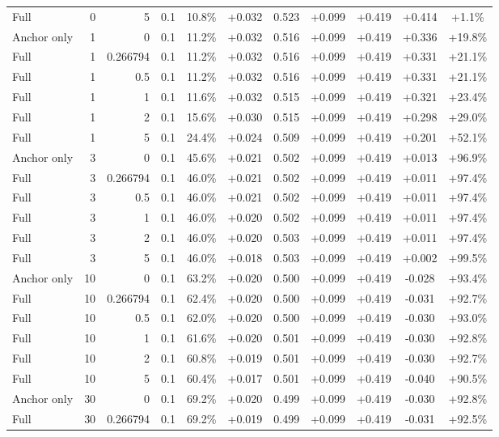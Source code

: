 \begin{table}[htbp]
\begin{tabular}{lrrrccccccc}
Full & 0 & 5 & 0.1 & 10.8\% & +0.032 & 0.523 & +0.099 & +0.419 & +0.414 & +1.1\% \\
Anchor only & 1 & 0 & 0.1 & 11.2\% & +0.032 & 0.516 & +0.099 & +0.419 & +0.336 & +19.8\% \\
Full & 1 & 0.266794 & 0.1 & 11.2\% & +0.032 & 0.516 & +0.099 & +0.419 & +0.331 & +21.1\% \\
Full & 1 & 0.5 & 0.1 & 11.2\% & +0.032 & 0.516 & +0.099 & +0.419 & +0.331 & +21.1\% \\
Full & 1 & 1 & 0.1 & 11.6\% & +0.032 & 0.515 & +0.099 & +0.419 & +0.321 & +23.4\% \\
Full & 1 & 2 & 0.1 & 15.6\% & +0.030 & 0.515 & +0.099 & +0.419 & +0.298 & +29.0\% \\
Full & 1 & 5 & 0.1 & 24.4\% & +0.024 & 0.509 & +0.099 & +0.419 & +0.201 & +52.1\% \\
Anchor only & 3 & 0 & 0.1 & 45.6\% & +0.021 & 0.502 & +0.099 & +0.419 & +0.013 & +96.9\% \\
Full & 3 & 0.266794 & 0.1 & 46.0\% & +0.021 & 0.502 & +0.099 & +0.419 & +0.011 & +97.4\% \\
Full & 3 & 0.5 & 0.1 & 46.0\% & +0.021 & 0.502 & +0.099 & +0.419 & +0.011 & +97.4\% \\
Full & 3 & 1 & 0.1 & 46.0\% & +0.020 & 0.502 & +0.099 & +0.419 & +0.011 & +97.4\% \\
Full & 3 & 2 & 0.1 & 46.0\% & +0.020 & 0.503 & +0.099 & +0.419 & +0.011 & +97.4\% \\
Full & 3 & 5 & 0.1 & 46.0\% & +0.018 & 0.503 & +0.099 & +0.419 & +0.002 & +99.5\% \\
Anchor only & 10 & 0 & 0.1 & 63.2\% & +0.020 & 0.500 & +0.099 & +0.419 & -0.028 & +93.4\% \\
Full & 10 & 0.266794 & 0.1 & 62.4\% & +0.020 & 0.500 & +0.099 & +0.419 & -0.031 & +92.7\% \\
Full & 10 & 0.5 & 0.1 & 62.0\% & +0.020 & 0.500 & +0.099 & +0.419 & -0.030 & +93.0\% \\
Full & 10 & 1 & 0.1 & 61.6\% & +0.020 & 0.501 & +0.099 & +0.419 & -0.030 & +92.8\% \\
Full & 10 & 2 & 0.1 & 60.8\% & +0.019 & 0.501 & +0.099 & +0.419 & -0.030 & +92.7\% \\
Full & 10 & 5 & 0.1 & 60.4\% & +0.017 & 0.501 & +0.099 & +0.419 & -0.040 & +90.5\% \\
Anchor only & 30 & 0 & 0.1 & 69.2\% & +0.020 & 0.499 & +0.099 & +0.419 & -0.030 & +92.8\% \\
Full & 30 & 0.266794 & 0.1 & 69.2\% & +0.019 & 0.499 & +0.099 & +0.419 & -0.031 & +92.5\% \\

\end{tabular}
\end{table}

